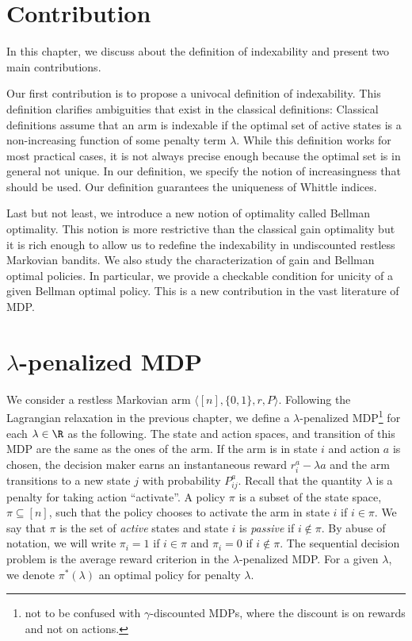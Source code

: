\section{Contribution}
\label{ch:idx:sec:contrib}

In this chapter, we discuss about the definition of indexability and present two main contributions.

Our first contribution is to propose a univocal definition of indexability. This definition clarifies ambiguities that exist in the classical definitions: Classical definitions assume that an arm is indexable if the optimal set of active states is a non-increasing function of some penalty term $\lambda$. While this definition works for most practical cases, it is not always precise enough because the optimal set is in general not unique. In our definition, we specify the notion of increasingness that should be used. Our definition guarantees the uniqueness of Whittle indices.

Last but not least, we introduce a new notion of optimality called Bellman optimality. This notion is more restrictive than the classical gain optimality but it is rich enough to allow us to redefine the indexability in undiscounted restless Markovian bandits. We also study the characterization of gain and Bellman optimal policies. In particular, we provide a checkable condition for unicity of a given Bellman optimal policy. This is a new contribution in the vast literature of MDP.

\section{\texorpdfstring{$\lambda$-p}{P}enalized MDP}
\label{ch:idx:sec:penal_mdp}

We consider a restless Markovian arm $\langle[n],\{0,1\},r,P\rangle$.
Following the Lagrangian relaxation in the previous chapter, we define a $\lambda$-penalized MDP\footnote{not to be confused with $\gamma$-discounted MDPs, where the discount is on rewards and not on actions.} for each $\lambda\in\R$ as the following.
The state and action spaces, and transition of this MDP are the same as the ones of the arm.
If the arm is in state $i$ and action $a$ is chosen, the decision maker earns an instantaneous
reward $r^a_i-\lambda a$ and the arm transitions to a new state $j$ with probability $P^a_{ij}$.
Recall that the quantity $\lambda$ is a penalty for taking action ``activate''.
A policy $\pi$ is a subset of the state space, $\pi\subseteq[n]$, such that the policy chooses to activate the arm in state $i$ if $i\in\pi$.
We say that $\pi$ is the set of \emph{active} states and state $i$ is \emph{passive} if $i\not\in\pi$.
By abuse of notation, we will write $\pi_i=1$ if $i\in\pi$ and $\pi_i=0$ if $i\not\in\pi$. 
The sequential decision problem is the average reward criterion in the $\lambda$-penalized MDP.
For a given $\lambda$, we denote $\pi^*(\lambda)$ an optimal policy for penalty $\lambda$.  %


